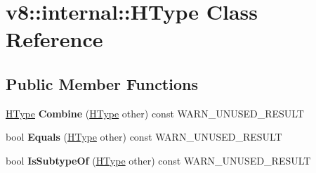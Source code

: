 \hypertarget{classv8_1_1internal_1_1_h_type}{}\section{v8\+:\+:internal\+:\+:H\+Type Class Reference}
\label{classv8_1_1internal_1_1_h_type}
\subsection*{Public Member Functions}
\begin{DoxyCompactItemize}
\item 
\hyperlink{classv8_1_1internal_1_1_h_type}{H\+Type} {\bfseries Combine} (\hyperlink{classv8_1_1internal_1_1_h_type}{H\+Type} other) const W\+A\+R\+N\+\_\+\+U\+N\+U\+S\+E\+D\+\_\+\+R\+E\+S\+U\+LT\hypertarget{classv8_1_1internal_1_1_h_type_ae45bce2ccc000f46eff51155133551fa}{}\label{classv8_1_1internal_1_1_h_type_ae45bce2ccc000f46eff51155133551fa}

\item 
bool {\bfseries Equals} (\hyperlink{classv8_1_1internal_1_1_h_type}{H\+Type} other) const W\+A\+R\+N\+\_\+\+U\+N\+U\+S\+E\+D\+\_\+\+R\+E\+S\+U\+LT\hypertarget{classv8_1_1internal_1_1_h_type_ae3bf20004bf68ff2828cc13d289378fe}{}\label{classv8_1_1internal_1_1_h_type_ae3bf20004bf68ff2828cc13d289378fe}

\item 
bool {\bfseries Is\+Subtype\+Of} (\hyperlink{classv8_1_1internal_1_1_h_type}{H\+Type} other) const W\+A\+R\+N\+\_\+\+U\+N\+U\+S\+E\+D\+\_\+\+R\+E\+S\+U\+LT\hypertarget{classv8_1_1internal_1_1_h_type_a2e44a6c4692aad2bb40d0324917042ec}{}\label{classv8_1_1internal_1_1_h_type_a2e44a6c4692aad2bb40d0324917042ec}

\end{DoxyCompactItemize}
